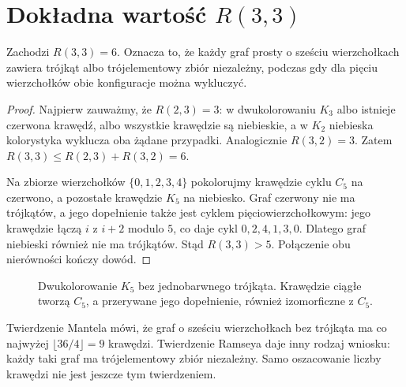 \section{Dokładna wartość \texorpdfstring{$R(3,3)$}{R(3,3)}}
\label{sec:tg-extremal-r33}

\begin{twierdzenie}
\label{thm:tg-ramsey-33}
Zachodzi $R(3,3)=6$.
Oznacza to, że każdy
graf prosty o sześciu
wierzchołkach zawiera
trójkąt albo trójelementowy
zbiór niezależny,
podczas gdy dla pięciu
wierzchołków obie
konfiguracje można wykluczyć.
\end{twierdzenie}
\begin{proof}
Najpierw zauważmy, że
$R(2,3)=3$: w dwukolorowaniu
$K_3$ albo istnieje
czerwona krawędź,
albo wszystkie krawędzie
są niebieskie, a
w $K_2$ niebieska
kolorystyka wyklucza
oba żądane przypadki.
Analogicznie $R(3,2)=3$.
Zatem
$R(3,3)\leq R(2,3)+R(3,2)=6$.

Na zbiorze wierzchołków $\{0,1,2,3,4\}$
pokolorujmy krawędzie cyklu $C_5$ na czerwono,
a pozostałe krawędzie
$K_5$ na niebiesko.
Graf czerwony nie ma
trójkątów, a jego
dopełnienie także jest cyklem pięciowierzchołkowym:
jego krawędzie łączą $i$ z $i+2$ modulo $5$,
co daje cykl $0,2,4,1,3,0$. Dlatego graf niebieski
również nie ma trójkątów.
Stąd $R(3,3)>5$.
Połączenie obu
nierówności kończy dowód.
\end{proof}

\begin{figure}[htbp]
\centering
{}
\caption{Dwukolorowanie $K_5$ bez
jednobarwnego trójkąta.
Krawędzie ciągłe tworzą $C_5$,
a przerywane jego dopełnienie,
również izomorficzne z $C_5$.}
\label{fig:tg-ramsey-c5}
\end{figure}

\begin{przyklad}
\label{ex:tg-ramsey-versus-turan}
Twierdzenie Mantela mówi,
że graf o sześciu wierzchołkach
bez trójkąta ma co najwyżej
$\lfloor36/4\rfloor=9$ krawędzi.
Twierdzenie Ramseya daje
inny rodzaj wniosku:
każdy taki graf ma
trójelementowy zbiór
niezależny. Samo
oszacowanie liczby
krawędzi nie jest
jeszcze tym twierdzeniem.
\end{przyklad}

